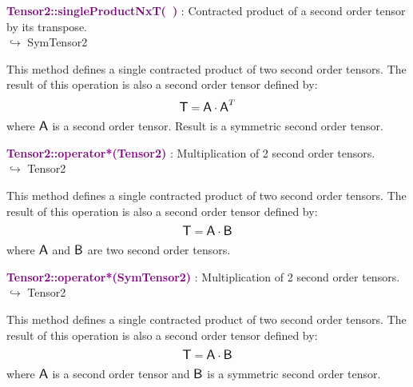 \textcolor{purple}{\textbf{Tensor2::singleProductNxT(~)}}\label{Tensor2::singleProductNxT()} : Contracted product of a second order tensor by its transpose.\\ \hspace*{5mm}$\hookrightarrow$ SymTensor2

This method defines a single contracted product of two second order tensors.
The result of this operation is also a second order tensor defined by:
\begin{equation*}
\mbox{\large\ensuremath{\mathsf{T}}} = \mbox{\large\ensuremath{\mathsf{A}}} \cdot \mbox{\large\ensuremath{\mathsf{A}}}^T
\end{equation*}
where $\mbox{\large\ensuremath{\mathsf{A}}}$ is a second order tensor. Result is a symmetric second order tensor.

\textcolor{purple}{\textbf{Tensor2::operator*(Tensor2)}}\label{Tensor2::operator*(Tensor2)} : Multiplication of 2 second order tensors.\\ \hspace*{5mm}$\hookrightarrow$ Tensor2

This method defines a single contracted product of two second order tensors.
The result of this operation is also a second order tensor defined by:
\begin{equation*}
\mbox{\large\ensuremath{\mathsf{T}}} = \mbox{\large\ensuremath{\mathsf{A}}} \cdot \mbox{\large\ensuremath{\mathsf{B}}}
\end{equation*}
where $\mbox{\large\ensuremath{\mathsf{A}}}$ and $\mbox{\large\ensuremath{\mathsf{B}}}$ are two second order tensors.

\textcolor{purple}{\textbf{Tensor2::operator*(SymTensor2)}}\label{Tensor2::operator*(SymTensor2)} : Multiplication of 2 second order tensors.\\ \hspace*{5mm}$\hookrightarrow$ Tensor2

This method defines a single contracted product of two second order tensors.
The result of this operation is also a second order tensor defined by:
\begin{equation*}
\mbox{\large\ensuremath{\mathsf{T}}} = \mbox{\large\ensuremath{\mathsf{A}}} \cdot \mbox{\large\ensuremath{\mathsf{B}}}
\end{equation*}
where $\mbox{\large\ensuremath{\mathsf{A}}}$ is a second order tensor and $\mbox{\large\ensuremath{\mathsf{B}}}$ is a symmetric second order tensor.

